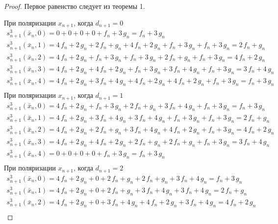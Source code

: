 \documentclass[a4paper, 12pt]{article}
\begin{document}
 \begin{proof}

Первое равенство следует из теоремы 1.

При поляризации $x_{n+1}$, когда $d_{n+1} = 0$
$$\begin{array}{l}
s_{n+1}^3(\bar{x}_n, 0) = 0 + 0 + 0 + 0 + f_n + 3\,g_n = f_n + 3\,g_n \\
s_{n+1}^3(\bar{x}_n, 1) = 4\,f_n + 2\,g_n + 2\,f_n + g_n + 4\,f_n + 2\,g_n + f_n + 3\,g_n + f_n + 3\,g_n = 2\,f_n + g_n \\
s_{n+1}^3(\bar{x}_n, 2) = 4\,f_n + 2\,g_n + f_n + 3\,g_n + f_n + 3\,g_n + 2\,f_n + g_n + f_n + 3\,g_n = 4\,f_n + 2\,g_n \\
s_{n+1}^3(\bar{x}_n, 3) = 4\,f_n + 2\,g_n + 4\,f_n + 2\,g_n + f_n + 3\,g_n + 3\,f_n + 4\,g_n + f_n + 3\,g_n = 3\,f_n + 4\,g_n \\
s_{n+1}^3(\bar{x}_n, 4) = 4\,f_n + 2\,g_n + 3\,f_n + 4\,g_n + 4\,f_n + 2\,g_n + 4\,f_n + 2\,g_n + f_n + 3\,g_n = f_n + 3\,g_n \\
\end{array}$$
При поляризации $x_{n+1}$, когда $d_{n+1} = 1$
$$\begin{array}{l}
s_{n+1}^3(\bar{x}_n, 0) = 4\,f_n + 2\,g_n + f_n + 3\,g_n + 2\,f_n + g_n + 3\,f_n + 4\,g_n + f_n + 3\,g_n = f_n + 3\,g_n \\
s_{n+1}^3(\bar{x}_n, 1) = 4\,f_n + 2\,g_n + 3\,f_n + 4\,g_n + 3\,f_n + 4\,g_n + f_n + 3\,g_n + f_n + 3\,g_n = 2\,f_n + g_n \\
s_{n+1}^3(\bar{x}_n, 2) = 4\,f_n + 2\,g_n + 2\,f_n + g_n + 3\,f_n + 4\,g_n + 4\,f_n + 2\,g_n + f_n + 3\,g_n = 4\,f_n + 2\,g_n \\
s_{n+1}^3(\bar{x}_n, 3) = 4\,f_n + 2\,g_n + 4\,f_n + 2\,g_n + 2\,f_n + g_n + 2\,f_n + g_n + f_n + 3\,g_n = 3\,f_n + 4\,g_n \\
s_{n+1}^3(\bar{x}_n, 4) = 0 + 0 + 0 + 0 + f_n + 3\,g_n = f_n + 3\,g_n \\
\end{array}$$
При поляризации $x_{n+1}$, когда $d_{n+1} = 2$
$$\begin{array}{l}
s_{n+1}^3(\bar{x}_n, 0) = 4\,f_n + 2\,g_n + 0 + 2\,f_n + g_n + 2\,f_n + g_n + 3\,f_n + 4\,g_n = f_n + 3\,g_n \\
s_{n+1}^3(\bar{x}_n, 1) = 4\,f_n + 2\,g_n + 0 + 2\,f_n + g_n + 3\,f_n + 4\,g_n + 3\,f_n + 4\,g_n = 2\,f_n + g_n \\
s_{n+1}^3(\bar{x}_n, 2) = 4\,f_n + 2\,g_n + 0 + 3\,f_n + 4\,g_n + 4\,f_n + 2\,g_n + 3\,f_n + 4\,g_n = 4\,f_n + 2\,g_n \\

\end{array}$$
\end{proof}
\end{document}
